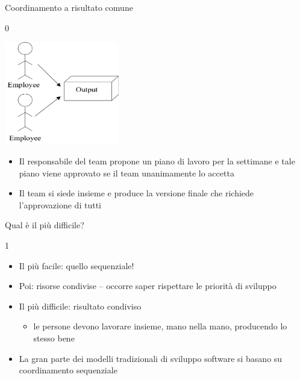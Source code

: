 \documentclass{beamer}
\begin{document}
\begin{frame}{\centerline{Coordinamento a risultato comune}}
0
\begin{center}
\includegraphics[width=50mm]{P2023.AIBCCSS.IlConcettoDiSoftware/img-img13.png}
\end{center}

\begin{itemize}
\item  Il responsabile del team propone un piano di lavoro per la settimane e tale piano viene approvato se il team unanimamente lo accetta

\item Il team si siede insieme e produce la versione finale che richiede l'approvazione di tutti

  
\end{itemize}


\end{frame}

\begin{frame}{\centerline{Qual \`{e} il pi\`{u} difficile?}}
1
\begin{itemize}

\item  Il pi\`{u} facile: quello sequenziale!
\item  Poi: risorse condivise -- occorre saper rispettare le priorit\`{a} di sviluppo
\item  Il pi\`{u} difficile: risultato condiviso
\begin{itemize}

\item  le persone devono lavorare insieme, mano nella mano, producendo lo stesso bene
\end{itemize}

\item La gran parte dei modelli tradizionali di sviluppo software si basano su coordinamento sequenziale

\end{itemize}

\end{frame}
\end{document}
